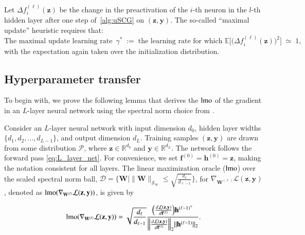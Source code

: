 Let $\Delta f^{(\ell)}_i(\mathbf{z})$ be the change in the preactivation of the $i$-th neuron in the $l$-th hidden layer after one step of~\cref{alg:uSCG} on $(\mathbf{z},\mathbf{y})$. The so-called “maximal update” heuristic requires that:
\[
\text{The maximal update learning rate }\,\gamma^*
\;:=\;
\text{the learning rate for which }
\mathbb{E}\bigl[\bigl(\Delta f^{(\ell)}_i(\mathbf{z})\bigr)^2\bigr] \;\simeq\; 1,
\]
with the expectation again taken over the initialization distribution.


\subsection{Hyperparameter transfer}\label{app:transfer:proof}

To begin with, we prove the following lemma that derives the $\operatorname{lmo}$ of the gradient in an $L$-layer neural network using the spectral norm choice from .

\begin{lemma}\label{lem:transfer:lmo}

Consider an $L$-layer neural network with input dimension $d_0$, hidden layer widths $\{d_1, d_2, \dots, d_{L-1}\}$, and output dimension $d_L$. Training samples $(\mathbf{z}, \mathbf{y})$ are drawn from some distribution $\mathcal{P}$, where $\mathbf{z} \in \mathbb{R}^{d_0}$ and $\mathbf{y} \in \mathbb{R}^{d_L}$. The network follows the forward pass \eqref{eq:L_layer_net}.
For convenience, we set \( \mathbf{f}^{(0)} = \mathbf{h}^{(0)} = \mathbf{z} \), making the notation consistent for all layers.
The linear maximization oracle ($\operatorname{lmo}$) over the scaled spectral norm ball, $\mathcal D = \big\{ \mathbf{W} \mid \|\mathbf{W}\|_{\mathcal S_\infty}\leq \sqrt{\tfrac{d_\ell}{d_{\ell-1}}}\big\}$, for $\nabla_{\mathbf{W}^{(\ell)}} \mathcal{L}(\mathbf{z},\mathbf{y}) $, denoted as $\operatorname{lmo}(\nabla_{\mathbf{W}^{(\ell)}} \mathcal{L}(\mathbf{z},\mathbf{y}) )$, is given by

\[
\operatorname{lmo}(\nabla_{\mathbf{W}^{(\ell)}}\mathcal{L}(\mathbf{z},\mathbf{y}) ) = \sqrt{\frac{d_{\ell}}{d_{\ell-1}}} \frac{\Bigl(\frac{d \mathcal{L}(\mathbf{z},\mathbf{y}) }{d \mathbf{f}^{(\ell)}} \Bigr) \mathbf{h}^{(\ell-1)^\top}}{\Bigl\|\frac{d \mathcal{L}(\mathbf{z},\mathbf{y}) }{d \mathbf{f}^{(\ell)}}\Bigr\|_2 \|\mathbf{h}^{(\ell-1)}\|_2}.
\]

\end{lemma}


